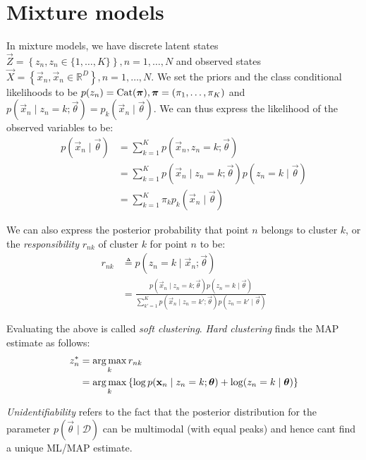 \section{Mixture models}
In mixture models, we have discrete latent states $\vec Z = \left\{z_n, z_n \in \{1, \dotsc, K\}\right\}, n = 1, \dotsc, N$ and observed states $\vec X = \left\{\vec x_n, \vec x_n \in \mathbb R^D\right\}, n = 1, \dotsc, N$. We set the priors and the class conditional likelihoods to be $p(z_n) = \operatorname{Cat}(\boldsymbol{\mathbf{\pi}}), \boldsymbol{\mathbf{\pi}} = (\pi_1, \dotsc, \pi_K)$ and $p(\vec x_n \mid z_n = k; \vec \theta) = p_k(\vec x_n \mid \vec \theta)$. We can thus express the likelihood of the observed variables to be:
\begin{align}
    p(\vec x_n \mid \vec \theta)    &= \sum_{k = 1}^K p(\vec x_n, z_n = k; \vec \theta) \nonumber\\
                                    &= \sum_{k = 1}^K p(\vec x_n \mid z_n = k; \vec \theta) p(z_n = k \mid \vec \theta) \nonumber\\
                                    &= \sum_{k = 1}^K \pi_k p_k(\vec x_n \mid \vec \theta) \label{eqn:models-mm-lik}
\end{align}

We can also express the posterior probability that point $n$ belongs to cluster $k$, or the \emph{responsibility} $r_{nk}$ of cluster $k$ for point $n$ to be:
\begin{align}
    r_{nk}  &\triangleq p(z_n = k \mid \vec x_n; \vec \theta) \nonumber\\
            &= \frac{p(\vec x_n \mid z_n = k; \vec \theta) p(z_n = k \mid \vec \theta)}{\sum_{k' = 1}^K p(\vec x_n \mid z_n = k'; \vec \theta) p(z_n = k' \mid \vec \theta)}
\end{align}

Evaluating the above is called \emph{soft clustering}. \emph{Hard clustering} finds the MAP estimate as follows:
\begin{align}
    z_n^\ast    &= \operatorname*{arg\,max}_k r_{nk} \nonumber\\
                &= \operatorname*{arg\,max}_k \left\{\log p(\boldsymbol{\mathbf{x}}_n \mid z_n = k; \boldsymbol{\mathbf{\theta}}) + \log(z_n = k \mid \boldsymbol{\mathbf{\theta}})\right\}
\end{align}

\emph{Unidentifiability} refers to the fact that the posterior distribution for the parameter $p(\vec \theta \mid \mathcal D)$ can be multimodal (with equal peaks) and hence cant find a unique ML/MAP estimate.

